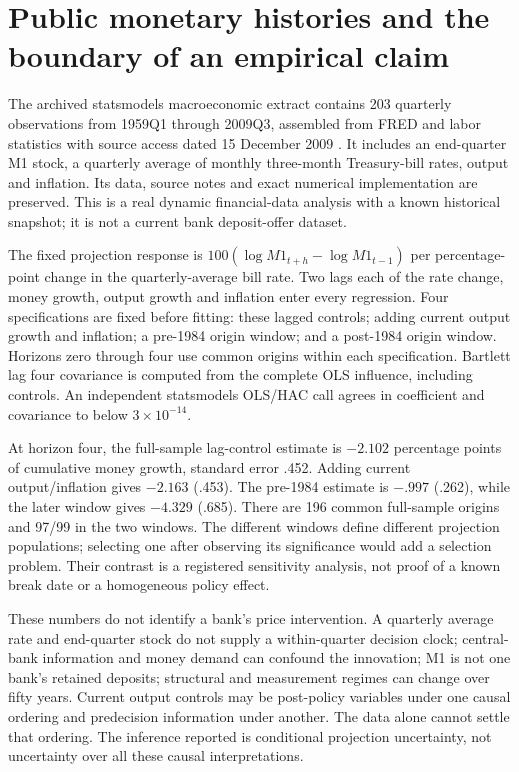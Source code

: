 \section{Public monetary histories and the boundary of an empirical claim}
\label{s6:public-dynamic}
The archived statsmodels macroeconomic extract contains 203 quarterly
observations from 1959Q1 through 2009Q3, assembled from FRED and labor
statistics with source access dated 15 December 2009
\citep{public_macrodata_dynamic}. It includes an end-quarter M1 stock,
a quarterly average of monthly three-month Treasury-bill rates, output
and inflation. Its data, source notes and exact numerical implementation
are preserved. This is a real dynamic financial-data analysis with a known
historical snapshot; it is not a current bank deposit-offer dataset.

The fixed projection response is
$100(\log M1_{t+h}-\log M1_{t-1})$ per percentage-point change in
the quarterly-average bill rate. Two lags each of the rate change, money
growth, output growth and inflation enter every regression. Four
specifications are fixed before fitting: these lagged controls; adding
current output growth and inflation; a pre-1984 origin window; and a
post-1984 origin window. Horizons zero through four use common origins
within each specification. Bartlett lag four covariance is computed from
the complete OLS influence, including controls. An independent statsmodels
OLS/HAC call agrees in coefficient and covariance to below $3\times10^{-14}$.

At horizon four, the full-sample lag-control estimate is $-2.102$
percentage points of cumulative money growth, standard error .452.
Adding current output/inflation gives $-2.163$ (.453). The pre-1984
estimate is $-.997$ (.262), while the later window gives $-4.329$ (.685).
There are 196 common full-sample origins and 97/99 in the two windows.
The different windows define different projection populations; selecting
one after observing its significance would add a selection problem. Their
contrast is a registered sensitivity analysis, not proof of a known break
date or a homogeneous policy effect.

These numbers do not identify a bank's price intervention. A quarterly
average rate and end-quarter stock do not supply a within-quarter decision
clock; central-bank information and money demand can confound the
innovation; M1 is not one bank's retained deposits; structural and
measurement regimes can change over fifty years. Current output controls
may be post-policy variables under one causal ordering and predecision
information under another. The data alone cannot settle that ordering.
The inference reported is conditional projection uncertainty, not uncertainty
over all these causal interpretations.

